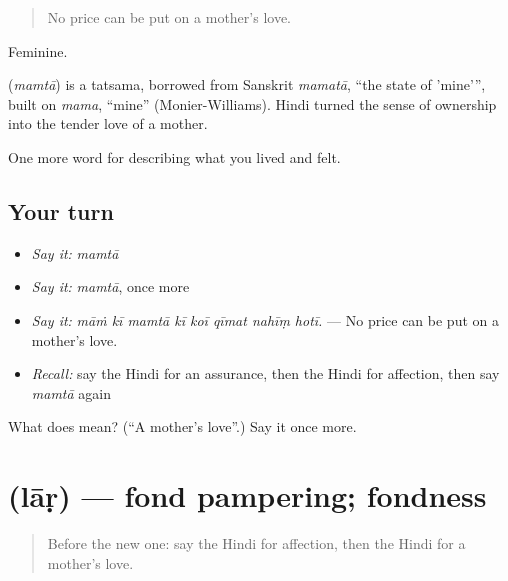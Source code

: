 \begin{quote}
No price can be put on a mother's love.
\end{quote}

Feminine.

\begin{cousinweb}
\textbf{} (\emph{mamtā}) is a tatsama, borrowed from Sanskrit \emph{mamatā}, \textquotedblleft{}the state of 'mine'\textquotedblright{}, built on \emph{mama}, \textquotedblleft{}mine\textquotedblright{} (Monier-Williams). Hindi turned the sense of ownership into the tender love of a mother.
\end{cousinweb}

\begin{grammarlens}[title={What you've built}]
One more word for describing what you lived and felt.
\end{grammarlens}

\subsection*{Your turn}
\begin{itemize}
\raggedright
  \item \emph{Say it:} \emph{mamtā}
  \item \emph{Say it:} \emph{mamtā}, once more
  \item \emph{Say it:} \emph{māṁ kī mamtā kī koī qīmat nahīṃ hotī.} — No price can be put on a mother's love.
  \item \emph{Recall:} say the Hindi for an assurance, then the Hindi for affection, then say \emph{mamtā} again
\end{itemize}

\begin{tcolorbox}[breakable,colback=teal!4,colframe=teal!35!black,title={Before you move on}]
What does  mean? (\textquotedblleft{}A mother's love\textquotedblright{}.) Say it once more.
\end{tcolorbox}
\section[\texorpdfstring{\hi{लाड़} (lāṛ)}{लाड़ (lāṛ)}]{ (lāṛ) — fond pampering; fondness}

\label{lesson:HI-C459-lar}



\begin{quote}
Before the new one: say the Hindi for affection, then the Hindi for a mother's love.
\end{quote}

